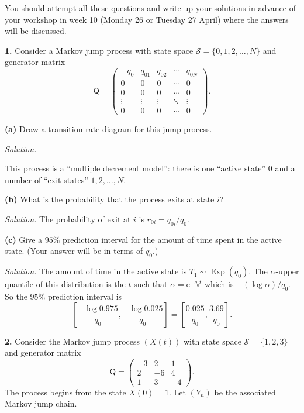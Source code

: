 \documentclass[
  a4paper,
]{article}
\theoremstyle{definition}
\theoremstyle{definition}
\theoremstyle{definition}
\theoremstyle{remark}
\begin{document}
You should attempt all these questions and write up your solutions in advance of your workshop in week 10 (Monday 26 or Tuesday 27 April) where the answers will be discussed.

\textbf{1.} Consider a Markov jump process with state space \(\mathcal S = \{0,1,2,\dots,N\}\) and generator matrix
\[ \mathsf Q = \begin{pmatrix} -q_0 & q_{01} & q_{02} & \cdots & q_{0N} \\
0    & 0      & 0      & \cdots & 0      \\
0    & 0      & 0      & \cdots & 0      \\
\vdots & \vdots & \vdots & \ddots & \vdots \\
0    & 0      & 0      & \cdots & 0  \end{pmatrix} . \]

\textbf{(a)} Draw a transition rate diagram for this jump process.

\begin{myanswers}
\emph{Solution.}

\end{myanswers}

This process is a ``multiple decrement model'': there is one ``active state'' 0 and a number of ``exit states'' \(1,2,\dots,N\).

\textbf{(b)} What is the probability that the process exits at state \(i\)?

\begin{myanswers}
\emph{Solution.} The probability of exit at \(i\) is \(r_{0i} = q_{0i}/q_0\).

\end{myanswers}

\textbf{(c)} Give a \(95\%\) prediction interval for the amount of time spent in the active state. (Your answer will be in terms of \(q_0\).)

\begin{myanswers}
\emph{Solution.}
The amount of time in the active state is \(T_1 \sim \operatorname{Exp}(q_0)\). The \(\alpha\)-upper quantile of this distribution is the \(t\) such that \(\alpha = \mathrm{e}^{-q_0 t}\) which is \(-(\log\alpha)/q_0\). So the \(95\%\) prediction interval is
\[ \left[ \frac{-\log0.975}{q_0} , \frac{-\log0.025}{q_0} \right] = \left[ \frac{0.025}{q_0}, \frac{3.69}{q_0} \right] .              \]

\end{myanswers}

\textbf{2.} Consider the Markov jump process \((X(t))\) with state space \(\mathcal S = \{1,2,3\}\) and generator matrix
\[ \mathsf Q = \begin{pmatrix} -3 & 2 & 1 \\ 2 & -6 & 4 \\ 1 & 3 & -4 \end{pmatrix} . \]
The process begins from the state \(X(0) = 1\).
Let \((Y_n)\) be the associated Markov jump chain.
\end{document}
